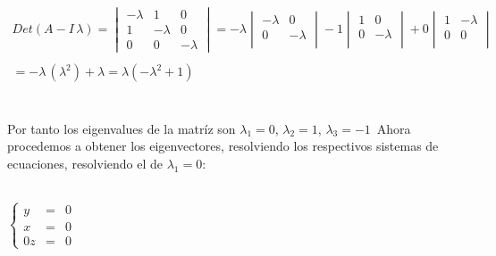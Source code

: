 \documentclass[11pt,letterpaper]{article}
\begin{document}
    \begin{align*}
        Det(A-I\,\lambda)=
            \begin{vmatrix}
                -\lambda & 1 & 0\\
                1& -\lambda & 0\\
                0& 0 & -\lambda
            \end{vmatrix}=-\lambda
            \begin{vmatrix}
                -\lambda & 0 \\
                0 & -\lambda \\
                \end{vmatrix}
                -1
                \begin{vmatrix}
                1 & 0 \\
                0& -\lambda \\
                \end{vmatrix}
                +0
                  \begin{vmatrix}
                1 & -\lambda \\
                0 & 0\\
                \end{vmatrix}\,\\
                \,\\
                =-\lambda\,(\lambda^2)+\lambda=\lambda(-\lambda^2+1)
    \end{align*}\,\\
    \,\\
    Por tanto los eigenvalues de la matr\'iz son $\lambda_1=0$, $\lambda_2=1$, $\lambda_3=-1$\,
    Ahora procedemos a obtener los eigenvectores, resolviendo los respectivos sistemas de ecuaciones, resolviendo
    el de $\lambda_1=0$:\,\\
    \,\\
   
    \begin{center}
       $\left\{ 
         \begin{array}{rcl}
            y&=&0\\
            x&=&0\\
            0z&=&0
         \end{array}
       \right.$
        \end{center}
    
\end{document}

